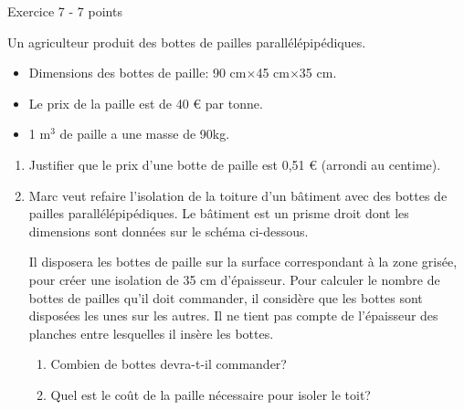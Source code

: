 
%
\begin{h2}Exercice 7 - 7 points\end{h2}
Un agriculteur produit des bottes de pailles parallélépipédiques.
\begin{itemize}
     \item
     Dimensions des bottes de paille: 90 cm$\times $45 cm$\times $35 cm.
\begin{center}
\end{center}
     \item
     Le prix de la paille est de 40 € par tonne.
     \item
     1 m$^{3}$ de paille a une masse de 90kg.
\end{itemize}
\begin{enumerate}
     \item
     Justifier que le prix d'une botte de paille est 0,51 € (arrondi au centime).
     \item
     Marc veut refaire l'isolation de la toiture d'un bâtiment avec des bottes de pailles parallélépipédiques. Le bâtiment est un prisme droit dont les dimensions sont données sur le schéma ci-dessous.
     \par
     Il disposera les bottes de paille sur la surface correspondant à la zone grisée, pour créer une isolation de 35 cm d'épaisseur. Pour calculer le nombre de bottes de pailles qu'il doit commander, il considère que les bottes sont disposées les unes sur les autres. Il ne tient pas compte de l'épaisseur des planches entre lesquelles il insère les bottes.

\begin{center}
\end{center}
     \begin{enumerate}
          \item
          Combien de bottes devra-t-il commander?
          \item
     Quel est le coût de la paille nécessaire pour isoler le toit?\end{enumerate}
\end{enumerate}

